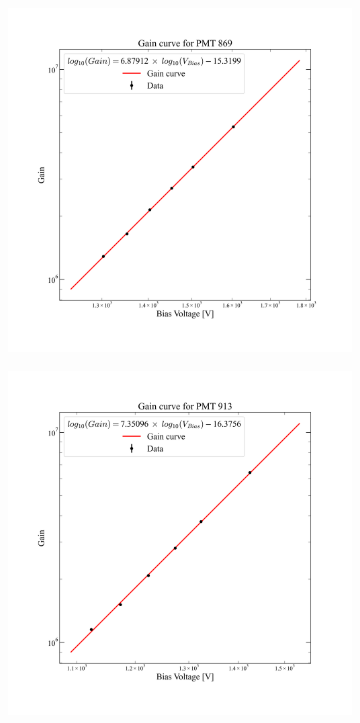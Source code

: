 \begin{figure}[ht!]
\begin{subfigure}[b]{0.47\textwidth}
     \end{subfigure}
     \hfill
     \begin{subfigure}[b]{0.47\textwidth}
         \centering
         \includegraphics[width=\textwidth]{figures/ODCommissioning/PMT869_GainCurve.png}
     \end{subfigure}
     \hfill
     \begin{subfigure}[b]{0.47\textwidth}
         \centering
         \includegraphics[width=\textwidth]{figures/ODCommissioning/PMT913_GainCurve.png}

\end{subfigure}
\end{figure}
